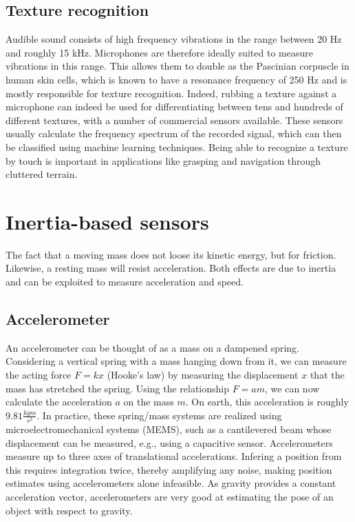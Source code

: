 \subsection{Texture recognition}
Audible sound consists of high frequency vibrations in the range between 20 Hz and roughly 15 kHz. Microphones are therefore ideally suited to measure vibrations in this range. This allows them to double as the Pascinian corpuscle in human skin cells, which is known to have a resonance frequency of 250 Hz and is mostly responsible for texture recognition. Indeed, rubbing a texture against a microphone can indeed be used for differentiating between tens and hundreds of different textures, with a number of commercial sensors available. These sensors usually calculate the frequency spectrum of the recorded signal, which can then be classified using machine learning techniques. Being able to recognize a texture by touch is important in applications like grasping and navigation through cluttered terrain.  

\section{Inertia-based sensors}
The fact that a moving mass does not loose its kinetic energy, but for friction. Likewise, a resting mass will resist acceleration. Both effects are due to inertia and can be exploited to measure acceleration and speed. 

\subsection{Accelerometer}
An accelerometer can be thought of as a mass on a dampened spring. Considering a vertical spring with a mass hanging down from it, we can measure the acting force $F=kx$ (Hooke's law) by measuring the displacement $x$ that the mass has stretched the spring. Using the relationship $F=am$, we can now calculate the acceleration $a$ on the mass $m$. On earth, this acceleration is roughly $9.81\frac{kg m}{s^2}$. In practice, these spring/mass systems are realized using microelectromechanical systems (MEMS), such as a cantilevered beam whose displacement can be measured, e.g., using a capacitive sensor. Accelerometers measure up to three axes of translational accelerations. Infering a position from this requires integration twice, thereby amplifying any noise, making position estimates using accelerometers alone infeasible. As gravity provides a constant acceleration vector, accelerometers are very good at estimating the pose of an object with respect to gravity.

